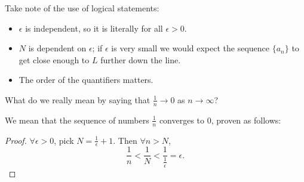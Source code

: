 \begin{remark}
Take note of the use of logical statements:
\begin{itemize}
\item $\epsilon$ is independent, so it is literally for all $\epsilon>0$.
\item $N$ is dependent on $\epsilon$; if $\epsilon$ is very small we would expect the sequence $\{a_n\}$ to get close enough to $L$ further down the line.
\item The order of the quantifiers matters.
\end{itemize}
\end{remark}

\begin{exmp}{}{}
What do we really mean by saying that $\frac{1}{n}\to 0$ as $n\to\infty$?

We mean that the sequence of numbers $\frac{1}{n}$ converges to 0, proven as follows:

\begin{proof}
$\forall\epsilon>0$, pick $N=\frac{1}{\epsilon}+1$. Then $\forall n>N$,
\[ \frac{1}{n} < \frac{1}{N} < \frac{1}{\frac{1}{\epsilon}} = \epsilon. \]
\end{proof}
\end{exmp}

